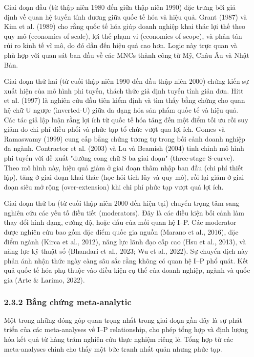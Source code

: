 \documentclass[12pt,a4paper]{article}
\begin{document}
Giai đoạn đầu (từ thập niên 1980 đến giữa thập niên 1990) đặc trưng bởi
giả định về quan hệ tuyến tính dương giữa quốc tế hóa và hiệu quả. Grant
(1987) và Kim et al. (1989) cho rằng quốc tế hóa giúp doanh nghiệp khai
thác lợi thế theo quy mô (economies of scale), lợi thế phạm vi
(economies of scope), và phân tán rủi ro kinh tế vĩ mô, do đó dẫn đến
hiệu quả cao hơn. Logic này trực quan và phù hợp với quan sát ban đầu về
các MNCs thành công từ Mỹ, Châu Âu và Nhật Bản.

Giai đoạn thứ hai (từ cuối thập niên 1990 đến đầu thập niên 2000) chứng
kiến sự xuất hiện của mô hình phi tuyến, thách thức giả định tuyến tính
giản đơn. Hitt et al. (1997) là nghiên cứu đầu tiên kiểm định và tìm
thấy bằng chứng cho quan hệ chữ U ngược (inverted-U) giữa đa dạng hóa
sản phẩm quốc tế và hiệu quả. Các tác giả lập luận rằng lợi ích từ quốc
tế hóa tăng đến một điểm tối ưu rồi suy giảm do chi phí điều phối và
phức tạp tổ chức vượt qua lợi ích. Gomes và Ramaswamy (1999) cung cấp
bằng chứng tương tự trong bối cảnh doanh nghiệp đa ngành. Contractor et
al. (2003) và Lu và Beamish (2004) tinh chỉnh mô hình phi tuyến với đề
xuất "đường cong chữ S ba giai đoạn" (three-stage S-curve). Theo mô hình
này, hiệu quả giảm ở giai đoạn thâm nhập ban đầu (chi phí thiết lập),
tăng ở giai đoạn khai thác (học hỏi tích lũy và quy mô), rồi lại giảm ở
giai đoạn siêu mở rộng (over-extension) khi chi phí phức tạp vượt quá
lợi ích.

Giai đoạn thứ ba (từ cuối thập niên 2000 đến hiện tại) chuyển trọng tâm
sang nghiên cứu các yếu tố điều tiết (moderators). Đây là các điều kiện
bối cảnh làm thay đổi hình dạng, cường độ, hoặc dấu của mối quan hệ
I--P. Các moderator được nghiên cứu bao gồm đặc điểm quốc gia nguồn
(Marano et al., 2016), đặc điểm ngành (Kirca et al., 2012), năng lực
lãnh đạo cấp cao (Hsu et al., 2013), và năng lực kỹ thuật số (Bhandari
et al., 2023; Wu et al., 2022). Sự chuyển dịch này phản ánh nhận thức
ngày càng sâu sắc rằng không có quan hệ I--P phổ quát. Kết quả quốc tế
hóa phụ thuộc vào điều kiện cụ thể của doanh nghiệp, ngành và quốc gia
(Arte \& Larimo, 2022).

\hypertarget{232-bux1eb1ng-chux1ee9ng-meta-analytic}{%
\subsubsection{2.3.2 Bằng chứng
meta-analytic}\label{232-bux1eb1ng-chux1ee9ng-meta-analytic}}

Một trong những đóng góp quan trọng nhất trong giai đoạn gần đây là sự
phát triển của các meta-analyses về I--P relationship, cho phép tổng hợp
và định lượng hóa kết quả từ hàng trăm nghiên cứu thực nghiệm riêng lẻ.
Tổng hợp từ các meta-analyses chính cho thấy một bức tranh nhất quán
nhưng phức tạp.
\end{document}
